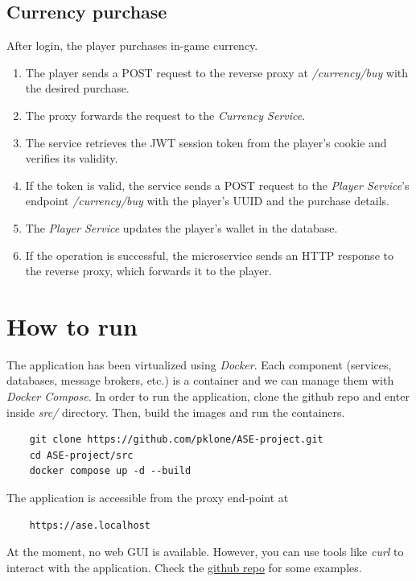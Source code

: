 \documentclass{article}
\begin{document}
\subsection{Currency purchase}
After login, the player purchases in-game currency.
\begin{enumerate}
    \item The player sends a POST request to the reverse proxy at \emph{/currency/buy} with the desired purchase.
    \item The proxy forwards the request to the \emph{Currency Service}.
    \item The service retrieves the JWT session token from the player's cookie and verifies its validity.
    \item If the token is valid, the service sends a POST request to the \emph{Player Service}'s endpoint \emph{/currency/buy} with the player's UUID and the purchase details.
    \item The \emph{Player Service} updates the player's wallet in the database.
    \item If the operation is successful, the microservice sends an HTTP response to the reverse proxy, which forwards it to the player.
\end{enumerate}

\section{How to run}
The application has been virtualized using \emph{Docker}. Each component (services, databases, message brokers, etc.) is a container and we can manage them with \emph{Docker Compose}. In order to run the application, clone the github repo and enter inside \emph{src/} directory. Then, build the images and run the containers.
\begin{verbatim}
    git clone https://github.com/pklone/ASE-project.git
    cd ASE-project/src
    docker compose up -d --build
\end{verbatim}
The application is accessible from the proxy end-point at
\begin{verbatim}
    https://ase.localhost
\end{verbatim}
At the moment, no web GUI is available. However, you can use tools like \emph{curl} to interact with the application. Check the \href{https://github.com/pklone/ASE-project/blob/main/README.md}{github repo} for some examples.
\end{document}
